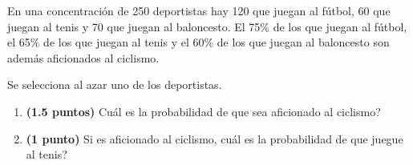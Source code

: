 
En una concentración de 250 deportistas hay 120 que juegan al fútbol, 60 que juegan al tenis y 70 que juegan al baloncesto. El 75\% de los que juegan al fútbol, el 65\% de los que juegan al tenis y el 60\% de los que juegan al baloncesto son además aficionados al ciclismo.

Se selecciona al azar uno de los deportistas.
\begin{enumerate}[label=\alph*)]
\item \textbf{(1.5 puntos)} \textquestiondown{}Cuál es la probabilidad de que sea aficionado al ciclismo?
\item \textbf{(1 punto)} Si es aficionado al ciclismo, \textquestiondown{}cuál es la probabilidad de que juegue al tenis?
\end{enumerate}
